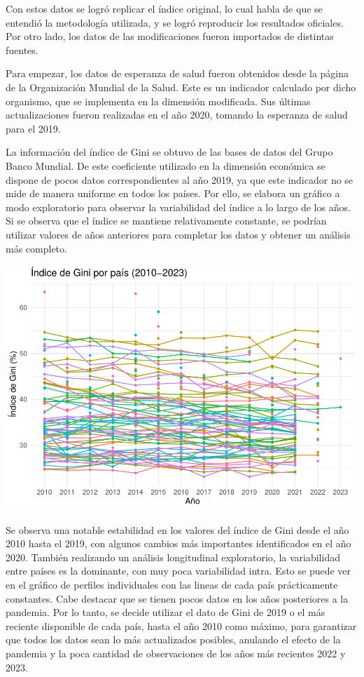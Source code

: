 \documentclass[
  10pt,
]{article}
\begin{document}
Con estos datos se logró replicar el índice original, lo cual habla de
que se entendió la metodología utilizada, y se logró reproducir los
resultados oficiales. Por otro lado, los datos de las modificaciones
fueron importados de distintas fuentes.

Para empezar, los datos de esperanza de salud fueron obtenidos desde la
página de la Organización Mundial de la Salud. Este es un indicador
calculado por dicho organismo, que se implementa en la dimensión
modificada. Sus últimas actualizaciones fueron realizadas en el año
2020, tomando la esperanza de salud para el 2019.

La información del índice de Gini se obtuvo de las bases de datos del
Grupo Banco Mundial. De este coeficiente utilizado en la dimensión
económica se dispone de pocos datos correspondientes al año 2019, ya que
este indicador no se mide de manera uniforme en todos los países. Por
ello, se elabora un gráfico a modo exploratorio para observar la
variabilidad del índice a lo largo de los años. Si se observa que el
índice se mantiene relativamente constante, se podrían utilizar valores
de años anteriores para completar los datos y obtener un análisis más
completo.

\includegraphics{Informe_files/figure-latex/unnamed-chunk-3-1.pdf}

Se observa una notable estabilidad en los valores del índice de Gini
desde el año 2010 hasta el 2019, con algunos cambios más importantes
identificados en el año 2020. También realizando un análisis
longitudinal exploratorio, la variabilidad entre países es la dominante,
con muy poca variabilidad intra. Esto se puede ver en el gráfico de
perfiles individuales con las lineas de cada país prácticamente
constantes. Cabe destacar que se tienen pocos datos en los años
posteriores a la pandemia. Por lo tanto, se decide utilizar el dato de
Gini de 2019 o el más reciente disponible de cada país, hasta el año
2010 como máximo, para garantizar que todos los datos sean lo más
actualizados posibles, anulando el efecto de la pandemia y la poca
cantidad de observaciones de los años más recientes 2022 y 2023.
\end{document}
